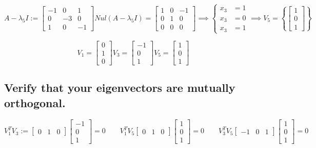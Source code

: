\[
	A-\lambda_5 I :=
	\begin{bmatrix}
		-1 & 0  & 1  \\
		0  & -3 & 0  \\
		1  & 0  & -1
	\end{bmatrix}
	Nul(A-\lambda_5 I) = \begin{bmatrix}1&0&-1\\ 0&1&0\\ 0&0&0\end{bmatrix}
	\implies \begin{cases}
		x_3 & = 1 \\
		x_3 & = 0 \\
		x_3 & = 1
	\end{cases}
	\implies V_5 = \left\{ \begin{bmatrix} 1 \\ 0 \\1 \end{bmatrix} \right\}
\]

\[ V_1 = \begin{bmatrix} 0 \\ 1 \\ 0 \end{bmatrix} V_3 = \begin{bmatrix} -1 \\ 0 \\1 \end{bmatrix} V_5 = \begin{bmatrix} 1 \\ 0 \\1 \end{bmatrix} \]

\subsection{Verify that your eigenvectors are mutually orthogonal.}
\[
	V_1^TV_3 :=
	\begin{bmatrix} 0 & 1 & 0 \end{bmatrix}
	\begin{bmatrix} -1 \\ 0 \\1 \end{bmatrix} = 0
	\quad \quad
	V_1^TV_5
	\begin{bmatrix} 0 & 1 & 0 \end{bmatrix}
	\begin{bmatrix} 1 \\ 0 \\1 \end{bmatrix} = 0
	\quad \quad
	V_3^TV_5
	\begin{bmatrix} -1 & 0 & 1 \end{bmatrix}
	\begin{bmatrix} 1 \\ 0 \\1 \end{bmatrix} = 0
\]


